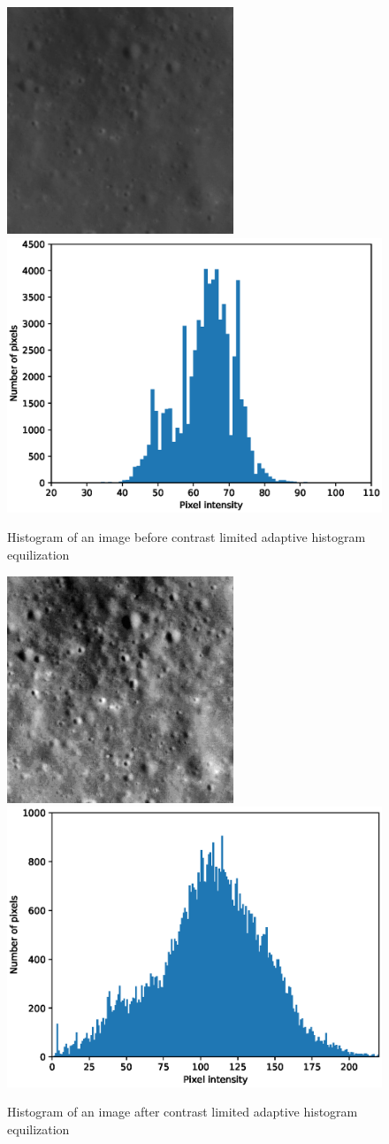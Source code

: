 \documentclass[11pt]{article}
\begin{document}
\begin{figure}[ht!]
	\includegraphics[width=.4\textwidth]{files/unet/IMG-0.png}
	\includegraphics[width=.6\textwidth]{files/unet/0_hist.eps}
	\caption{Histogram of an image before contrast limited adaptive histogram equilization}
	\label{hist}
	
	\includegraphics[width=.4\textwidth]{files/unet/0_clahe.png}
	\includegraphics[width=.6\textwidth]{files/unet/0_hist_clahe.eps}
	\caption{Histogram of an image after contrast limited adaptive histogram equilization}
	
	\label{clahe}
\end{figure}
\end{document}
